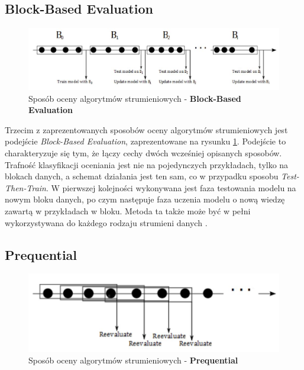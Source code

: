 \subsection{Block-Based Evaluation}

\begin{figure}[h] 
    \centering
    \includegraphics[width=15cm]{figures/block_processing.JPG}
    \caption{Sposób oceny algorytmów strumieniowych - \textbf{Block-Based Evaluation} \cite{Prezentacja:Strumienie}}\label{Figure:BlockBasedEvaluation}
\end{figure}

\noindent Trzecim z zaprezentowanych sposobów oceny algorytmów strumieniowych jest podejście \textit{Block-Based Evaluation}, zaprezentowane na rysunku \ref{Figure:BlockBasedEvaluation}. Podejście to charakteryzuje się tym, że łączy cechy dwóch wcześniej opisanych sposobów. Trafność klasyfikacji oceniania jest nie na pojedynczych przykładach, tylko na blokach danych, a schemat działania jest ten sam, co w przypadku sposobu \textit{Test-Then-Train}. W pierwszej kolejności wykonywana jest faza testowania modelu na nowym bloku danych, po czym następuje faza uczenia modelu o nową wiedzę zawartą w przykładach w bloku. Metoda ta także może być w pełni wykorzystywana do każdego rodzaju strumieni danych \cite{DBrzezinski}.

\subsection{Prequential}

\begin{figure}[h] 
    \centering
    \includegraphics[width=15cm]{figures/prequential.JPG}
    \caption{Sposób oceny algorytmów strumieniowych - \textbf{Prequential} \cite{Prezentacja:Strumienie}}\label{Figure:Prequential}
\end{figure}

